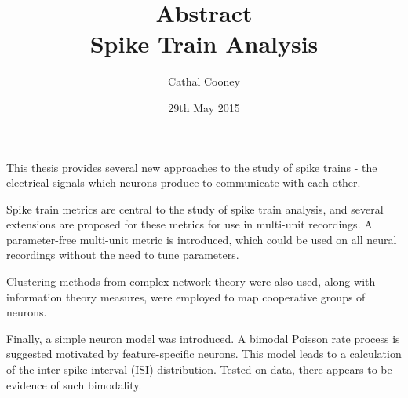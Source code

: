 \documentclass[12pt]{article}
\begin{document}
\title{{\bf Abstract} \\ Spike Train Analysis}
\author{Cathal Cooney}
\date{29th May 2015}
\maketitle

This thesis provides several new approaches to the study of spike trains - the electrical signals which neurons produce to communicate with each other.

Spike train metrics are central to the study of spike train analysis, and several extensions are proposed for these metrics for use in multi-unit recordings.  A parameter-free multi-unit metric is introduced, which could be used on all neural recordings without the need to tune parameters.

Clustering methods from complex network theory were also used, along with information theory measures, were employed to map cooperative groups of neurons. 

Finally, a simple neuron model was introduced.  A bimodal Poisson rate process is suggested motivated by feature-specific neurons.  This model leads to a calculation of the inter-spike interval (ISI) distribution.  Tested on data, there appears to be evidence of such bimodality.
\end{document}
